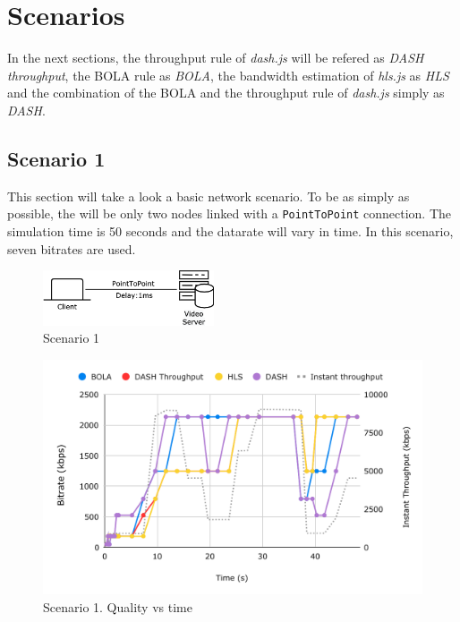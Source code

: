 \section{Scenarios}
\label{sec:scenarios}

In the next sections, the throughput rule of \textit{dash.js} will be refered as \textit{DASH throughput},
the BOLA rule as \textit{BOLA}, the bandwidth estimation of \textit{hls.js} as \textit{HLS} and the combination
of the BOLA and the throughput rule of \textit{dash.js} simply as \textit{DASH}.

\subsection{Scenario 1}
This section will take a look a basic network scenario. To be as simply as possible, the will be 
only two nodes linked with a \texttt{PointToPoint} connection. The simulation time is 50 seconds 
and the datarate will vary in time. In this scenario, seven bitrates are used.

\begin{figure}[h]
    \centering
    \includegraphics[width=0.45\textwidth]{img/scenario1.png}
    \caption{Scenario 1}
    \label{fig:scenario1}
\end{figure}

\begin{figure}[]
    \centering
    \includegraphics[width=\textwidth]{img/s1c1_1.pdf}
    \caption{Scenario 1. Quality vs time}
    \label{fig:s1c1}
\end{figure}


